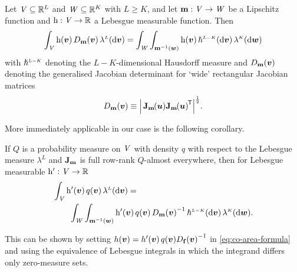 \begin{theorem}\label{thm:co-area-formula}
Let $\mathit{V} \subseteq \mathbb{R}^L$ and $\mathit{W} \subseteq \mathbb{R}^K$ with $L \geq K$, and let ${\mathbf{m}}:\mathit{V}\to\mathit{W}$ be a Lipschitz function and $\mathrm{h} : \mathit{V} \to \mathbb{R}$ a Lebesgue measurable function. Then
\begin{equation}\label{eq:co-area-formula}
    \int_{\set{V}} 
      \func{h}(\vct{v}) \, \jacobproddet{\vctfunc{m}}{\vct{v}}
    \,\lebm{L}(\dr\vct{v})
    = 
    \int_{\set{W}}
      \int_{\preimage{\vctfunc{m}}{\vct{w}}} \func{h}(\vct{v}) \,\haum{L-K}(\dr\vct{v})
    \,\lebm{K}(\dr\vct{w})
\end{equation}
with $\haum{L-K}$ denoting the $L-K$-dimensional Hausdorff measure and $\jacobproddet{\vctfunc{m}}{\vct{v}}$ denoting the generalised Jacobian determinant for `wide' rectangular Jacobian matrices
\begin{equation}\label{eq:jacobian-product-det}
  \jacobproddet{\vctfunc{m}}{\vct{v}} \equiv 
  \left|\,\jacob{\vctfunc{m}}{\vct{u}}\jacob{\vctfunc{m}}{\vct{u}}\tr\right|^{\frac{1}{2}}.
\end{equation}
\end{theorem}
More immediately applicable in our case is the following corollary.
\begin{corollary}\label{col:co-area-formula}
If $Q$ is a probability measure on $\mathit{V}$ with density $q$ with respect to the Lebesgue measure $\lambda^L$ and $\mathbf{J}_{{\mathbf{m}}}$ is full row-rank $Q$-almost everywhere, then for Lebesgue measurable $\mathrm{h}' : \mathit{V} \to \mathbb{R}$
\begin{equation}\label{eq:co-area-formula-corollary}
\begin{split}
    &\int_{\set{V}} 
      \func{h}'(\vct{v})\,q(\vct{v})
    \,\lebm{L}(\dr\vct{v})
    =\,\\
    &\qquad
    \int_{\set{W}}
      \int_{\preimage{\vctfunc{m}}{\vct{w}}}
        \func{h}'(\vct{v}) \,
        q(\vct{v})\,
        \jacobproddet{\vctfunc{m}}{\vct{v}}^{-1}
      \,\haum{L-K}(\dr\vct{v})
    \,\lebm{K}(\dr\vct{w}).
\end{split}
\end{equation}
\end{corollary}
This can be shown by setting $h(\vct{v}) = h'(\vct{v})\,q(\vct{v})\jacobproddet{\vctfunc{f}}{\vct{v}}^{-1}$ in \eqref{eq:co-area-formula} and using the equivalence of Lebesgue integrals in which the integrand differs only zero-measure sets. 

